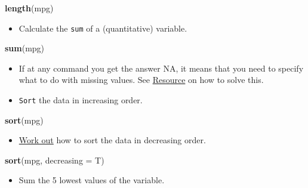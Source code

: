 \documentclass[]{article}
\newenvironment{Shaded}{\begin{snugshade}}{\end{snugshade}}
\newcommand{\DataTypeTok}[1]{\textcolor[rgb]{0.13,0.29,0.53}{#1}}
\newcommand{\KeywordTok}[1]{\textcolor[rgb]{0.13,0.29,0.53}{\textbf{#1}}}
\newcommand{\NormalTok}[1]{#1}
\providecommand{\tightlist}{%
  \setlength{\itemsep}{0pt}\setlength{\parskip}{0pt}}
\begin{document}
\begin{Shaded}
\begin{Highlighting}[]
\KeywordTok{length}\NormalTok{(mpg)}
\end{Highlighting}
\end{Shaded}

\begin{itemize}
\tightlist
\item
  Calculate the \texttt{sum} of a (quantitative) variable.
\end{itemize}

\begin{Shaded}
\begin{Highlighting}[]
\KeywordTok{sum}\NormalTok{(mpg)}
\end{Highlighting}
\end{Shaded}

\begin{itemize}
\tightlist
\item
  If at any command you get the answer NA, it means that you need to specify what to do with missing values.
  See \href{https://stat.ethz.ch/R-manual/R-devel/library/base/html/sum.html}{Resource} on how to solve this.
\end{itemize}

\begin{itemize}
\tightlist
\item
  \texttt{Sort} the data in increasing order.
\end{itemize}

\begin{Shaded}
\begin{Highlighting}[]
\KeywordTok{sort}\NormalTok{(mpg)}
\end{Highlighting}
\end{Shaded}

\begin{itemize}
\tightlist
\item
  \href{https://stat.ethz.ch/R-manual/R-devel/library/base/html/sort.html}{Work out} how to sort the data in decreasing order.
\end{itemize}

\begin{Shaded}
\begin{Highlighting}[]
\KeywordTok{sort}\NormalTok{(mpg, }\DataTypeTok{decreasing =}\NormalTok{ T)}
\end{Highlighting}
\end{Shaded}

\begin{itemize}
\tightlist
\item
  Sum the 5 lowest values of the variable.
\end{itemize}
\end{document}
